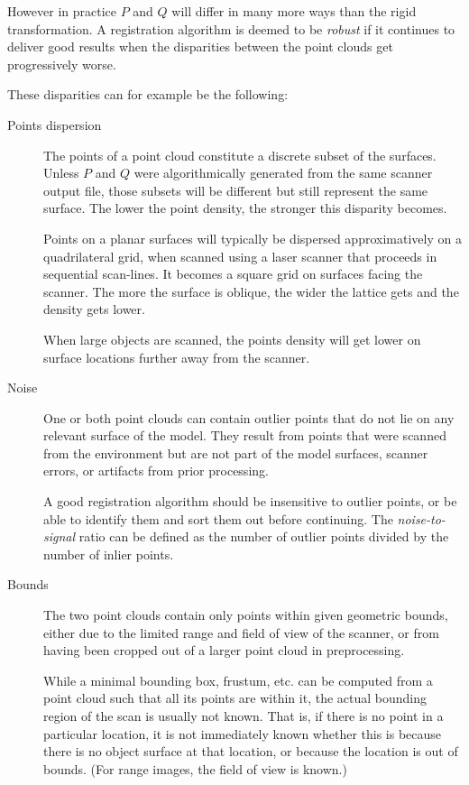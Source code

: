 However in practice $P$ and $Q$ will differ in many more ways than the rigid transformation. A registration algorithm is deemed to be \emph{robust} if it continues to deliver good results when the disparities between the point clouds get progressively worse.

These disparities can for example be the following:
\begin{description}
\item[Points dispersion] The points of a point cloud constitute a discrete subset of the surfaces. Unless $P$ and $Q$ were algorithmically generated from the same scanner output file, those subsets will be different but still represent the same surface. The lower the point density, the stronger this disparity becomes.

Points on a planar surfaces will typically be dispersed approximatively on a quadrilateral grid, when scanned using a laser scanner that proceeds in sequential scan-lines. It becomes a square grid on surfaces facing the scanner. The more the surface is oblique, the wider the lattice gets and the density gets lower.

When large objects are scanned, the points density will get lower on surface locations further away from the scanner. 

\item[Noise] One or both point clouds can contain outlier points that do not lie on any relevant surface of the model. They result from points that were scanned from the environment but are not part of the model surfaces, scanner errors, or artifacts from prior processing.

A good registration algorithm should be insensitive to outlier points, or be able to identify them and sort them out before continuing. The \emph{noise-to-signal} ratio can be defined as the number of outlier points divided by the number of inlier points.

\item[Bounds] The two point clouds contain only points within given geometric bounds, either due to the limited range and field of view of the scanner, or from having been cropped out of a larger point cloud in preprocessing.

While a minimal bounding box, frustum, etc. can be computed from a point cloud such that all its points are within it, the actual bounding region of the scan is usually not known. That is, if there is no point in a particular location, it is not immediately known whether this is because there is no object surface at that location, or because the location is out of bounds. (For range images, the field of view is known.)


\end{description}
